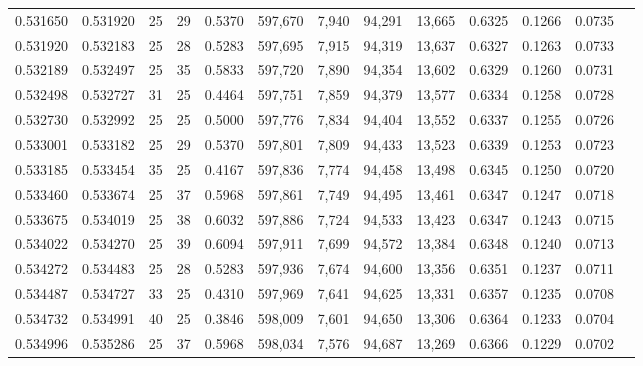 \begin{tabular}{rrrrrrrrrrrrr}
0.531650 & 0.531920 &    25 &  29 &                                     0.5370 & 597,670 &   7,940 &  94,291 &  13,665 & 0.6325 & 0.1266 & 0.0735 \\
0.531920 & 0.532183 &    25 &  28 &                                     0.5283 & 597,695 &   7,915 &  94,319 &  13,637 & 0.6327 & 0.1263 & 0.0733 \\
0.532189 & 0.532497 &    25 &  35 &                                     0.5833 & 597,720 &   7,890 &  94,354 &  13,602 & 0.6329 & 0.1260 & 0.0731 \\
0.532498 & 0.532727 &    31 &  25 &                                     0.4464 & 597,751 &   7,859 &  94,379 &  13,577 & 0.6334 & 0.1258 & 0.0728 \\
0.532730 & 0.532992 &    25 &  25 &                                     0.5000 & 597,776 &   7,834 &  94,404 &  13,552 & 0.6337 & 0.1255 & 0.0726 \\
0.533001 & 0.533182 &    25 &  29 &                                     0.5370 & 597,801 &   7,809 &  94,433 &  13,523 & 0.6339 & 0.1253 & 0.0723 \\
0.533185 & 0.533454 &    35 &  25 &                                     0.4167 & 597,836 &   7,774 &  94,458 &  13,498 & 0.6345 & 0.1250 & 0.0720 \\
0.533460 & 0.533674 &    25 &  37 &                                     0.5968 & 597,861 &   7,749 &  94,495 &  13,461 & 0.6347 & 0.1247 & 0.0718 \\
0.533675 & 0.534019 &    25 &  38 &                                     0.6032 & 597,886 &   7,724 &  94,533 &  13,423 & 0.6347 & 0.1243 & 0.0715 \\
0.534022 & 0.534270 &    25 &  39 &                                     0.6094 & 597,911 &   7,699 &  94,572 &  13,384 & 0.6348 & 0.1240 & 0.0713 \\
0.534272 & 0.534483 &    25 &  28 &                                     0.5283 & 597,936 &   7,674 &  94,600 &  13,356 & 0.6351 & 0.1237 & 0.0711 \\
0.534487 & 0.534727 &    33 &  25 &                                     0.4310 & 597,969 &   7,641 &  94,625 &  13,331 & 0.6357 & 0.1235 & 0.0708 \\
0.534732 & 0.534991 &    40 &  25 &                                     0.3846 & 598,009 &   7,601 &  94,650 &  13,306 & 0.6364 & 0.1233 & 0.0704 \\
0.534996 & 0.535286 &    25 &  37 &                                     0.5968 & 598,034 &   7,576 &  94,687 &  13,269 & 0.6366 & 0.1229 & 0.0702 \\

\end{tabular}
